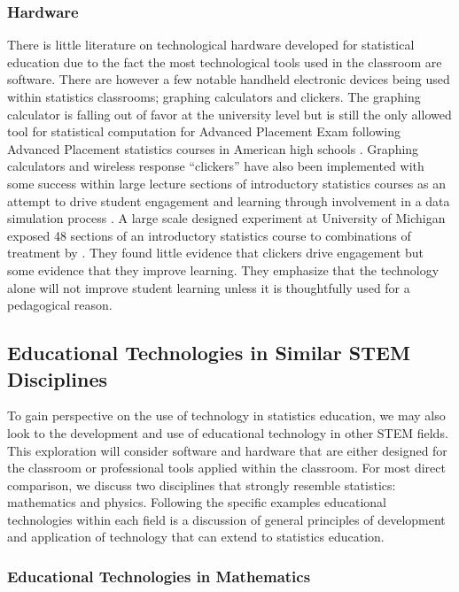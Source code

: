 \subsubsection{Hardware} 

There is little literature on technological hardware developed for statistical education due to the fact the most technological tools used in the classroom are software. There are however a few notable handheld electronic devices being used within statistics classrooms; graphing calculators and clickers. The graphing calculator is falling out of favor at the university level but is still the only allowed tool for statistical computation for Advanced Placement Exam following Advanced Placement statistics courses in American high schools \citep{APcalculator}. Graphing calculators and wireless response ``clickers'' have also been implemented with some success within large lecture sections of introductory statistics courses as an attempt to drive student engagement and learning through involvement in a data simulation process \citep{Kaplan2011}.  A large scale designed experiment at University of Michigan exposed 48 sections of an introductory statistics course to combinations of treatment by \citet{McGowanGunderson2010}. They found little evidence that clickers drive engagement but some evidence that they improve learning. They emphasize that the technology alone will not improve student learning unless it is thoughtfully used for a pedagogical reason.

\subsection{Educational Technologies in Similar STEM Disciplines}
\label{EdTechSTEM}

To gain perspective on the use of technology in statistics education, we may also look to the development and use of educational technology in other STEM fields. This exploration will consider software and hardware that are either designed for the classroom or professional tools applied within the classroom. For most direct comparison, we discuss two disciplines that strongly resemble statistics: mathematics and physics. Following the specific examples educational technologies within each field is a discussion of general principles of development and application of technology that can extend to statistics education. 

\subsubsection{Educational Technologies in Mathematics}
\label{EdTechMath}

